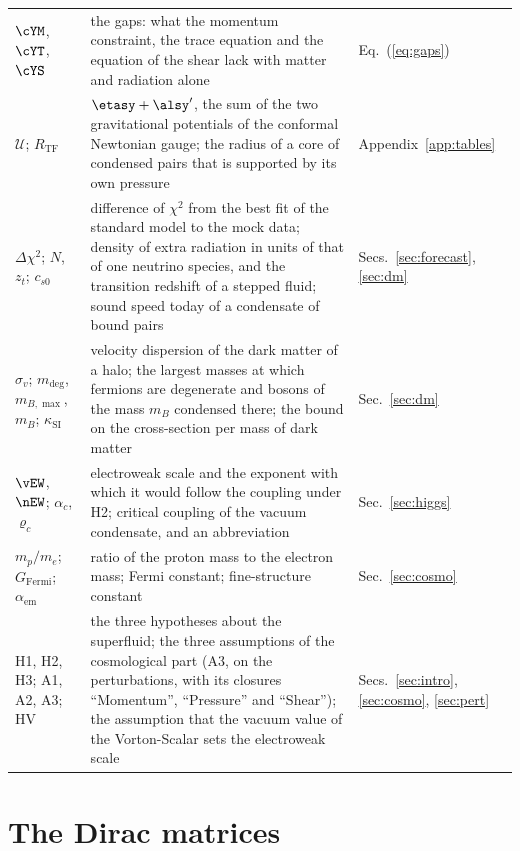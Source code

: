 \begin{table}
\begin{ruledtabular}
\begin{tabular}{p{}p{}p{}}
$\cYM$, $\cYT$, $\cYS$ & the gaps: what the momentum constraint, the trace equation and the equation of the shear lack with matter and radiation alone & Eq.~(\ref{eq:gaps}) \\
$\mathcal{U}$; $R_{\mathrm{TF}}$ & $\etasy+\alsy'$, the sum of the two gravitational potentials of the conformal Newtonian gauge; the radius of a core of condensed pairs that is supported by its own pressure & Appendix~\ref{app:tables} \\
$\Delta\chi^{2}$; $N$, $z_t$; $c_{s0}$ & difference of $\chi^{2}$ from the best fit of the standard model to the mock data; density of extra radiation in units of that of one neutrino species, and the transition redshift of a stepped fluid; sound speed today of a condensate of bound pairs & Secs.~\ref{sec:forecast}, \ref{sec:dm} \\
$\sigma_v$; $m_{\mathrm{deg}}$, $m_{B,\max}$, $m_B$; $\kappa_{\mathrm{SI}}$ & velocity dispersion of the dark matter of a halo; the largest masses at which fermions are degenerate and bosons of the mass $m_B$ condensed there; the bound on the cross-section per mass of dark matter & Sec.~\ref{sec:dm} \\
$\vEW$, $\nEW$; $\alpha_c$, $\varrho_c$ & electroweak scale and the exponent with which it would follow the coupling under H2; critical coupling of the vacuum condensate, and an abbreviation & Sec.~\ref{sec:higgs} \\
$m_p/m_e$; $G_{\mathrm{Fermi}}$; $\alpha_{\mathrm{em}}$ & ratio of the proton mass to the electron mass; Fermi constant; fine-structure constant & Sec.~\ref{sec:cosmo} \\
H1, H2, H3; A1, A2, A3; HV & the three hypotheses about the superfluid; the three assumptions of the cosmological part (A3, on the perturbations, with its closures ``Momentum'', ``Pressure'' and ``Shear''); the assumption that the vacuum value of the Vorton-Scalar sets the electroweak scale & Secs.~\ref{sec:intro}, \ref{sec:cosmo}, \ref{sec:pert} \\
\end{tabular}
\end{ruledtabular}
\end{table}

\section{The Dirac matrices}
\label{app:matrices}

